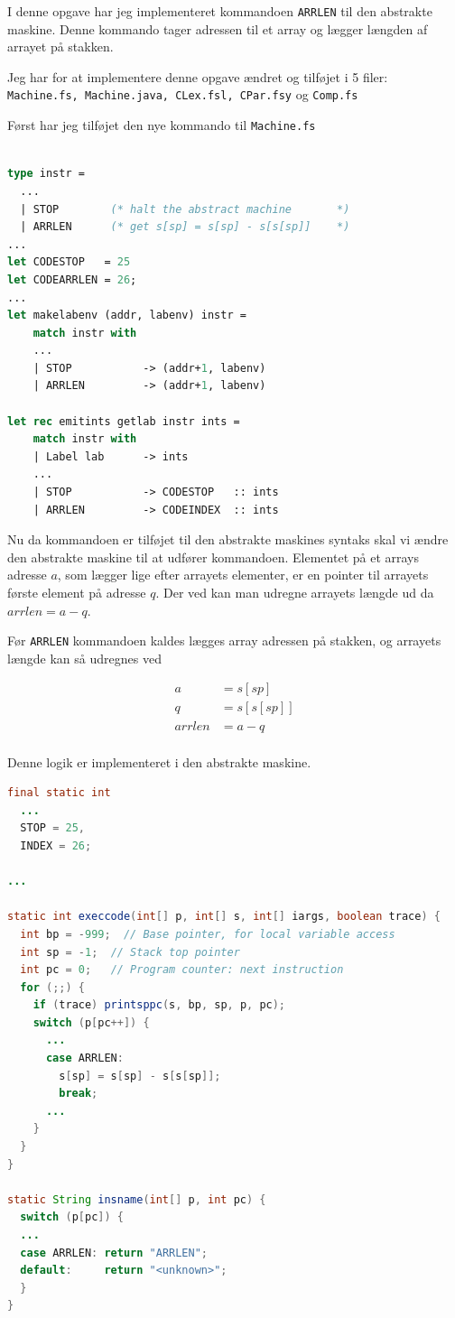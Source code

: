 \documentclass[danish,a4paper]{report}
\begin{document}
I denne opgave har jeg implementeret kommandoen \texttt{ARRLEN} til den abstrakte maskine. Denne kommando tager adressen til et array og lægger længden af arrayet på stakken.

Jeg har for at implementere denne opgave ændret og tilføjet i 5 filer: \texttt{Machine.fs, Machine.java, CLex.fsl, CPar.fsy} og \texttt{Comp.fs}

Først har jeg tilføjet den nye kommando til \texttt{Machine.fs}

\begin{lstlisting}[language=ML]

type instr =
  ...
  | STOP        (* halt the abstract machine       *)
  | ARRLEN      (* get s[sp] = s[sp] - s[s[sp]]    *)
...
let CODESTOP   = 25
let CODEARRLEN = 26;
...
let makelabenv (addr, labenv) instr = 
    match instr with
    ...
    | STOP           -> (addr+1, labenv)
    | ARRLEN         -> (addr+1, labenv)

let rec emitints getlab instr ints = 
    match instr with
    | Label lab      -> ints
    ...
    | STOP           -> CODESTOP   :: ints
    | ARRLEN         -> CODEINDEX  :: ints
\end{lstlisting}

Nu da kommandoen er tilføjet til den abstrakte maskines syntaks skal vi ændre den abstrakte maskine til at udfører kommandoen. Elementet på et arrays adresse $a$, som lægger lige efter arrayets elementer, er en pointer til arrayets første element på adresse $q$. Der ved kan man udregne arrayets længde ud da $arrlen = a-q$.

Før \texttt{ARRLEN} kommandoen kaldes lægges array adressen på stakken, og arrayets længde kan så udregnes ved

\begin{align*}
a &= s[sp]\\
q &= s[s[sp]]\\
arrlen &= a - q\\
\end{align*}

Denne logik er implementeret i den abstrakte maskine.

\begin{lstlisting}[language=java]
final static int 
  ...
  STOP = 25,
  INDEX = 26;

...

static int execcode(int[] p, int[] s, int[] iargs, boolean trace) {
  int bp = -999;  // Base pointer, for local variable access 
  int sp = -1;  // Stack top pointer
  int pc = 0;   // Program counter: next instruction
  for (;;) {
    if (trace) printsppc(s, bp, sp, p, pc);
    switch (p[pc++]) {
      ...
      case ARRLEN:
        s[sp] = s[sp] - s[s[sp]];
        break;
      ...
    }
  }
}

static String insname(int[] p, int pc) {
  switch (p[pc]) {
  ...
  case ARRLEN: return "ARRLEN";
  default:     return "<unknown>";
  }
}
\end{lstlisting}
\end{document}

